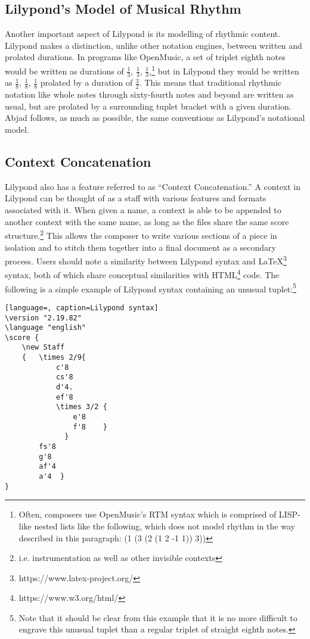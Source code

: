 \subsection{Lilypond's Model of Musical Rhythm}

Another important aspect of Lilypond is its modelling of rhythmic content. Lilypond makes a distinction, unlike other notation engines, between written and prolated durations. In programs like OpenMusic, a set of triplet eighth notes would be written as durations of \( \frac{1}{3} \), \( \frac{1}{3} \), \( \frac{1}{3} \),\footnote{Often, composers use OpenMusic's RTM syntax which is comprised of LISP-like nested lists like the following, which does not model rhythm in the way described in this paragraph: (1 (3 (2 (1 2 -1 1)) 3))} but in Lilypond they would be written as \( \frac{1}{8} \), \( \frac{1}{8} \), \( \frac{1}{8} \) prolated by a duration of \( \frac{3}{2} \). This means that traditional rhythmic notation like whole notes through sixty-fourth notes and beyond are written as usual, but are prolated by a surrounding tuplet bracket with a given duration. Abjad follows, as much as possible, the same conventions as Lilypond’s notational model.

\subsection{Context Concatenation}

Lilypond also has a feature referred to as ``Context Concatenation.'' A context in Lilypond can be thought of as a staff with various features and formats associated with it. When given a name, a context is able to be appended to another context with the same name, as long as the files share the same score structure.\footnote{i.e. instrumentation as well as other invisible contexts} This allows the composer to write various sections of a piece in isolation and to stitch them together into a final document as a secondary process. Users should note a similarity between Lilypond syntax and \LaTeX \:\footnote{https://www.latex-project.org/} syntax, both of which share conceptual similarities with HTML\footnote{https://www.w3.org/html/} code. The following is a simple example of Lilypond syntax containing an unusual tuplet:\footnote{Note that it should be clear from this example that it is no more difficult to engrave this unusual tuplet than a regular triplet of straight eighth notes.}

\singlespace
\begin{lstlisting}[language=, caption=Lilypond syntax]
\version "2.19.82"
\language "english"
\score {
    \new Staff
    {   \times 2/9{
            c'8
            cs'8
            d'4.
            ef'8
            \times 3/2 {
                e'8
                f'8    }
              }
        fs'8
        g'8
        af'4
        a'4  }
}
\end{lstlisting}
\doublespace

